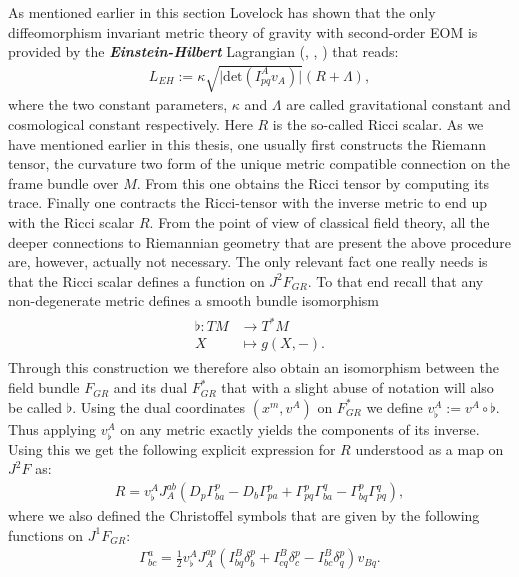 \documentclass[a4paper,12pt, DIV=14, BCOR=5mm, twoside, headsepline, numbers=noenddot]{scrbook}
\begin{document}
As mentioned earlier in this section Lovelock has shown that the only diffeomorphism invariant metric theory of gravity with second-order EOM is provided by the \textit{\textbf{Einstein-Hilbert}} Lagrangian (\cite{Lovelock1969}, \cite{doi:10.1063/1.1665613}, \cite{doi:10.1063/1.1666069}) that reads:
\begin{align}
    L_{EH} := \kappa \sqrt{\vert \mathrm{det} \left ( I^A_{pq}v_A \right ) \vert }  \left( R + \Lambda \right ),
\end{align}
where the two constant parameters, $\kappa$ and $\Lambda$ are called gravitational constant and cosmological constant respectively. Here $R$ is the so-called Ricci scalar. As we have mentioned earlier in this thesis, one usually first constructs the Riemann tensor, the curvature two form of the unique metric compatible connection on the frame bundle over $M$. From this one obtains the Ricci tensor by computing its trace. Finally one contracts the Ricci-tensor with the inverse metric to end up with the Ricci scalar $R$. From the point of view of classical field theory, all the deeper connections to Riemannian geometry that are present the above procedure are, however, actually not necessary. The only relevant fact one really needs is that the Ricci scalar defines a function on $J^2F_{GR}$. To that end recall that any non-degenerate metric defines a smooth bundle isomorphism 
\begin{align}\label{music}
\begin{aligned}
\flat : TM &\longrightarrow T^{\ast}M\\
X &\longmapsto g(X,-) .
\end{aligned}
\end{align}
Through this construction we therefore also obtain an isomorphism between the field bundle $F_{GR}$ and its dual $F_{GR}^{\ast}$ that with a slight abuse of notation will also be called $\flat$. 
Using the dual coordinates $(x^m,v^A)$ on $F_{GR}^{\ast}$ we define $v^A_{\flat} := v^A \circ \flat$. Thus applying $v^A_{\flat}$ on any metric exactly yields the components of its inverse. Using this we get the following explicit expression for $R$ understood as a map on $J^2F$ as:
\begin{align}
R = v_{\flat}^A J_A^{ab} \left ( D_p \Gamma^p_{ba} - D_b \Gamma^p_{pa} + \Gamma^p_{pq} \Gamma^q_{ba} - \Gamma^p_{bq} \Gamma^q_{pq} \right ),
\end{align}
where we also defined the Christoffel symbols that are given by the following functions on $J^1F_{GR}$:
\begin{align}
\Gamma^a_{bc} = \frac{1}{2} v_{\flat}^A J_A^{ap} \left ( I^B_{bq}\delta^p_b + I^B_{cq}\delta^p_c - I^B_{bc}\delta^p_q  \right ) v_{Bq}.
\end{align}
\end{document}

